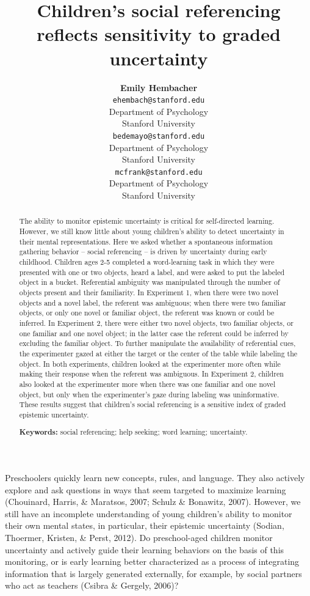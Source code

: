 \documentclass[10pt, letterpaper]{article}
\title{Children's social referencing reflects sensitivity to graded uncertainty}
\author{{\large \bf Emily  Hembacher} \\ \texttt{ehembach@stanford.edu} \\ Department of Psychology \\ Stanford University \And {\large \bf Benjamin deMayo} \\ \texttt{bedemayo@stanford.edu} \\ Department of Psychology \\ Stanford University \And {\large \bf Michael C. Frank} \\ \texttt{mcfrank@stanford.edu} \\ Department of Psychology \\ Stanford University}
\begin{document}
\maketitle

\begin{abstract}
The ability to monitor epistemic uncertainty is critical for
self-directed learning. However, we still know little about young
children's ability to detect uncertainty in their mental
representations. Here we asked whether a spontaneous information
gathering behavior -- social referencing -- is driven by uncertainty
during early childhood. Children ages 2-5 completed a word-learning task
in which they were presented with one or two objects, heard a label, and
were asked to put the labeled object in a bucket. Referential ambiguity
was manipulated through the number of objects present and their
familiarity. In Experiment 1, when there were two novel objects and a
novel label, the referent was ambiguous; when there were two familiar
objects, or only one novel or familiar object, the referent was known or
could be inferred. In Experiment 2, there were either two novel objects,
two familiar objects, or one familiar and one novel object; in the
latter case the referent could be inferred by excluding the familiar
object. To further manipulate the availability of referential cues, the
experimenter gazed at either the target or the center of the table while
labeling the object. In both experiments, children looked at the
experimenter more often while making their response when the referent
was ambiguous. In Experiment 2, children also looked at the experimenter
more when there was one familiar and one novel object, but only when the
experimenter's gaze during labeling was uninformative. These results
suggest that children's social referencing is a sensitive index of
graded epistemic uncertainty.

\textbf{Keywords:}
social referencing; help seeking; word learning; uncertainty.
\end{abstract}

Preschoolers quickly learn new concepts, rules, and language. They also
actively explore and ask questions in ways that seem targeted to
maximize learning (Chouinard, Harris, \& Maratsos, 2007; Schulz \&
Bonawitz, 2007). However, we still have an incomplete understanding of
young children's ability to monitor their own mental states, in
particular, their epistemic uncertainty (Sodian, Thoermer, Kristen, \&
Perst, 2012). Do preschool-aged children monitor uncertainty and
actively guide their learning behaviors on the basis of this monitoring,
or is early learning better characterized as a process of integrating
information that is largely generated externally, for example, by social
partners who act as teachers (Csibra \& Gergely, 2006)?
\end{document}
